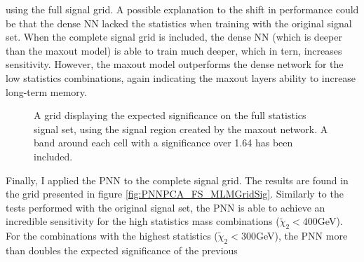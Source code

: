 using the full signal grid. A possible explanation to the shift in performance could be that the dense \ac{NN} lacked the statistics when training 
with the original signal set. When the complete signal grid is included, the dense \ac{NN} (which is deeper than the maxout model) is able to train 
much deeper, which in tern, increases sensitivity. However, the maxout model outperforms the dense network for the low statistics combinations, again 
indicating the maxout layers ability to increase long-term memory.\\
\begin{figure}
    \caption{A grid displaying the expected significance on the full statistics signal set, using the signal region 
    created by the maxout network. A band around each cell with a significance over 1.64 has been included.}
    \label{fig:MaxOutPCA_FS_MLMGridSig}
\end{figure}
Finally, I applied the \ac{PNN} to the complete signal grid. The results are found in the grid presented in figure \ref{fig:PNNPCA_FS_MLMGridSig}.
Similarly to the tests performed with the original signal set, the \ac{PNN} is able to achieve an incredible sensitivity for the high statistics mass combinations
($\tilde{\chi}_2<400$GeV). For the combinations with the highest statistics ($\tilde{\chi}_2<300$GeV), the \ac{PNN} more than doubles the expected significance of the previous 
